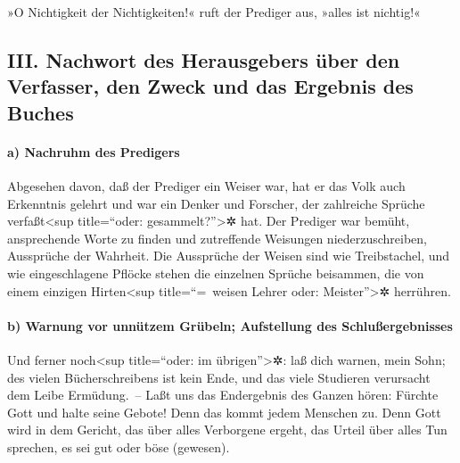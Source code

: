 »O Nichtigkeit der Nichtigkeiten!« ruft der Prediger aus,
»alles ist nichtig!«

\hypertarget{iii.-nachwort-des-herausgebers-uxfcber-den-verfasser-den-zweck-und-das-ergebnis-des-buches}{%
\subsection{III. Nachwort des Herausgebers über den Verfasser, den Zweck
und das Ergebnis des
Buches}\label{iii.-nachwort-des-herausgebers-uxfcber-den-verfasser-den-zweck-und-das-ergebnis-des-buches}}

\hypertarget{a-nachruhm-des-predigers}{%
\paragraph{a) Nachruhm des Predigers}\label{a-nachruhm-des-predigers}}

Abgesehen davon, daß der Prediger ein Weiser war, hat er
das Volk auch Erkenntnis gelehrt und war ein Denker und Forscher, der
zahlreiche Sprüche verfaßt\textless sup title=``oder:
gesammelt?''\textgreater✲ hat. Der Prediger war bemüht,
ansprechende Worte zu finden und zutreffende Weisungen
niederzuschreiben, Aussprüche der Wahrheit. Die
Aussprüche der Weisen sind wie Treibstachel, und wie eingeschlagene
Pflöcke stehen die einzelnen Sprüche beisammen, die von einem einzigen
Hirten\textless sup title=``=~weisen Lehrer oder: Meister''\textgreater✲
herrühren.

\hypertarget{b-warnung-vor-unnuxfctzem-gruxfcbeln-aufstellung-des-schluuxdfergebnisses}{%
\paragraph{b) Warnung vor unnützem Grübeln; Aufstellung des
Schlußergebnisses}\label{b-warnung-vor-unnuxfctzem-gruxfcbeln-aufstellung-des-schluuxdfergebnisses}}

Und ferner noch\textless sup title=``oder: im
übrigen''\textgreater✲: laß dich warnen, mein Sohn; des vielen
Bücherschreibens ist kein Ende, und das viele Studieren verursacht dem
Leibe Ermüdung.~-- Laßt uns das Endergebnis des Ganzen
hören: Fürchte Gott und halte seine Gebote! Denn das kommt jedem
Menschen zu. Denn Gott wird in dem Gericht, das über
alles Verborgene ergeht, das Urteil über alles Tun sprechen, es sei gut
oder böse (gewesen).
